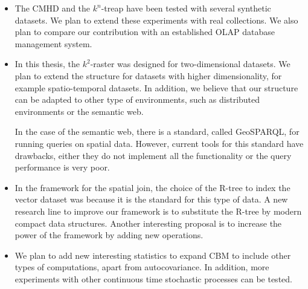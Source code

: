 	\begin{itemize}
		\item The CMHD and the $k^n$-treap have been tested with several synthetic datasets. We plan to extend these experiments with real collections. We also plan to compare our contribution with an established OLAP database management system.
		\item In this thesis, the $k^2$-raster was designed for two-dimensional datasets. We plan to extend the structure for datasets with higher dimensionality, for example    spatio-temporal datasets. In addition, we believe that our structure can be adapted to other type of environments, such as distributed environments or the semantic web. 
		
		In the case of the semantic web,  there is a standard, called GeoSPARQL, for running queries on spatial data. However, current tools for this standard have  drawbacks, either they do not implement all the functionality or the query performance is very poor.
		\item  In the framework for the spatial join, the choice of  the R-tree to index the vector dataset  was because it is the standard for this type of data. A new  research line to improve our framework is to substitute the R-tree by modern compact data structures. Another interesting proposal is to increase the power of the framework by adding new operations.
		\item We plan to add new interesting statistics to expand CBM to include other types of computations, apart from autocovariance. In addition, more experiments with other continuous time stochastic processes can be tested.
	\end{itemize}